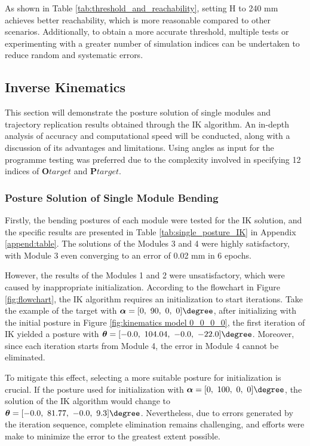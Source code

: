 \vspace{-5mm}

As shown in Table \ref{tab:threshold_and_reachability}, setting H to 240 mm achieves better reachability, 
which is more reasonable compared to other scenarios. Additionally, to obtain a more accurate threshold, 
multiple tests or experimenting with a greater number of simulation indices can be undertaken to reduce random 
and systematic errors.
\subsection{Inverse Kinematics}
This section will demonstrate the posture solution of single modules and trajectory replication results 
obtained through the IK algorithm. An in-depth analysis of accuracy and computational speed will be conducted, 
along with a discussion of its advantages and limitations. Using angles as input for the programme testing was 
preferred due to the complexity involved in specifying 12 indices of $\textbf{O}{target}$ and $\textbf{P}{target}$. 
\subsubsection{Posture Solution of Single Module Bending}
Firstly, the bending postures of each module were tested for the IK solution, and the 
specific results are presented in Table \ref{tab:single_posture_IK} in Appendix \ref{append:table}. The 
solutions of the Modules 3 and 4 were highly satisfactory, with Module 3 even converging to an error of 0.02 mm 
in 6 epochs. 

However, the results of the Modules 1 and 2 were unsatisfactory, which were caused by inappropriate 
initialization. According to the flowchart in Figure \ref{fig:flowchart}, the IK algorithm requires an 
initialization to start iterations. Take the example of the target with 
$\boldsymbol{\alpha} = [0,\ 90,\ 0,\ 0]\degree$, after initializing with the initial posture in Figure 
\ref{fig:kinematics model 0_0_0_0}, the first iteration of IK yielded a posture with 
$\boldsymbol{\theta} = [-0.0,\ 104.04,\ -0.0,\ -22.0]\degree$. Moreover, since each iteration starts from Module 4, 
the error in Module 4 cannot be eliminated. 

To mitigate this effect, selecting a more suitable posture for 
initialization is crucial. If the posture used for initialization with 
$\boldsymbol{\alpha} = [0,\ 100,\ 0,\ 0]\degree$, the solution of the IK algorithm would change to 
$\boldsymbol{\theta} = [-0.0,\ 81.77,\ -0.0,\ 9.3]\degree$. Nevertheless, due to errors generated by the 
iteration sequence, complete elimination remains challenging, and efforts were make to minimize the error to the 
greatest extent possible.  

